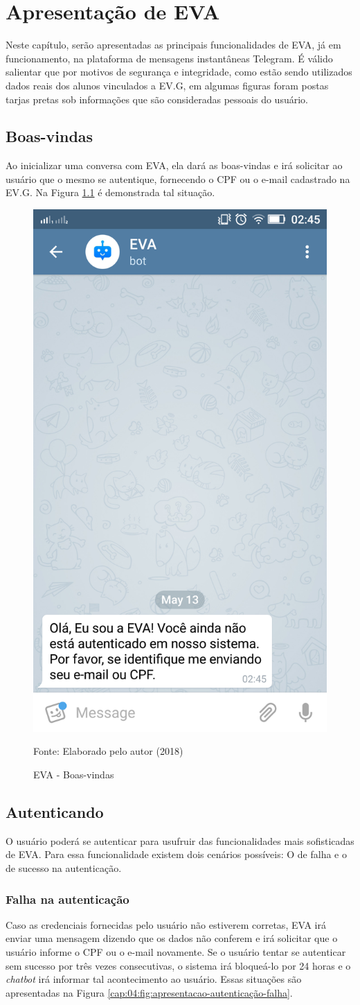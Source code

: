 \chapter{Apresentação de EVA}

Neste capítulo, serão apresentadas as principais funcionalidades de EVA, já em funcionamento, na plataforma de mensagens instantâneas Telegram. É válido salientar que por motivos de segurança e integridade, como estão sendo utilizados dados reais dos alunos vinculados a EV.G, em algumas figuras foram postas tarjas pretas sob informações que são consideradas pessoais do usuário.

\section{Boas-vindas}

Ao inicializar uma conversa com EVA, ela dará as boas-vindas e irá solicitar ao usuário que o mesmo se autentique, fornecendo o CPF ou o e-mail cadastrado na EV.G. Na Figura \ref{cap:04:fig:apresentacao-boas-vindas} é demonstrada tal situação.

\begin{figure}[htb!]
    \centering
    \includegraphics[width=0.2\linewidth]{src/imagens/apresentacao-boas-vindas.png}
    \caption{EVA - Boas-vindas} Fonte: Elaborado pelo autor (2018)
    \label{cap:04:fig:apresentacao-boas-vindas}
\end{figure}

\section{Autenticando}
O usuário poderá se autenticar para usufruir das funcionalidades mais sofisticadas de EVA. Para essa funcionalidade existem dois cenários possíveis: O de falha e o de sucesso na autenticação.

\subsection{Falha na autenticação}
Caso as credenciais fornecidas pelo usuário não estiverem corretas, EVA irá enviar uma mensagem dizendo que os dados não conferem e irá solicitar que o usuário informe o CPF ou o e-mail novamente. Se o usuário tentar se autenticar sem sucesso por três vezes consecutivas, o sistema irá bloqueá-lo por 24 horas e o \textit{chatbot} irá informar tal acontecimento ao usuário. Essas situações são apresentadas na Figura \ref{cap:04:fig:apresentacao-autenticação-falha}.

